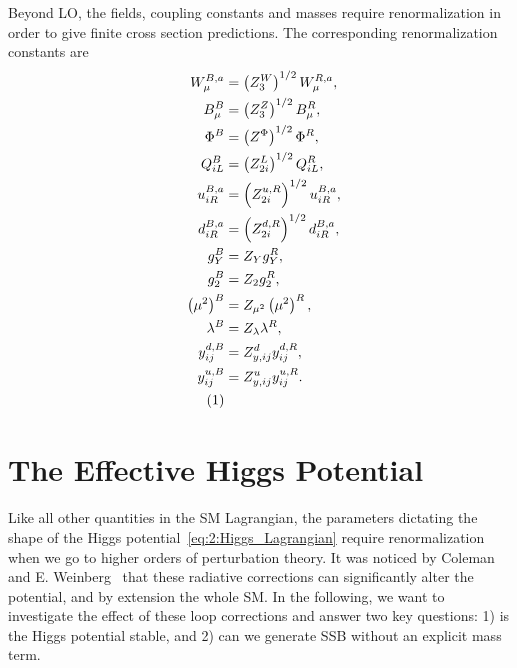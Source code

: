 Beyond \acs{LO}, the fields, coupling constants and masses require renormalization in order to give finite cross section predictions. The corresponding renormalization constants are
\begin{align*}
  W_\mu^{B,a} &= \left(Z_3^W \right)^{1/2} W_\mu^{R,a}, \\
  B_\mu^{B} &= \left(Z_3^Z \right)^{1/2} B_\mu^{R}, \\
  \Phi^{B} &= \left(Z^\Phi \right)^{1/2} \Phi^{R}, \\
  Q_{iL}^{B} &= \left(Z_{2i}^L \right)^{1/2} Q_{iL}^{R}, \\
  u_{iR}^{B,a} &= \left(Z_{2i}^{u,R} \right)^{1/2} u_{iR}^{B,a}, \\
  d_{iR}^{B,a} &= \left(Z_{2i}^{d,R} \right)^{1/2} d_{iR}^{B,a}, \\
  g_Y^B &= Z_Y g_Y^R ,\\
  g_2^B &= Z_2 g_2^R ,\\
  \left(\mu^2 \right)^B &= Z_{\mu^2} \left( \mu^2 \right)^R, \\
  \lambda^B &= Z_\lambda \lambda^R ,\\
  y_{ij}^{d,B} &= Z_{y,ij}^{d} y_{ij}^{d,R}, \\
  y_{ij}^{u,B} &= Z_{y,ij}^{u} y_{ij}^{u,R}. \\
  \refstepcounter{equation}
  \tag{\theequation} \label{eq:2:renormalization}
\end{align*}

\chapter{The Effective Higgs Potential} \label{sec:2:effective_higgs_potential}
Like all other quantities in the \acs{SM} Lagrangian, the parameters dictating the shape of the Higgs potential~\eqref{eq:2:Higgs_Lagrangian} require renormalization when we go to higher orders of perturbation theory. It was noticed by Coleman and E. Weinberg~\cite{Coleman:1973jx} that these radiative corrections can significantly alter the potential, and by extension the whole \acs{SM}. In the following, we want to investigate the effect of these loop corrections and answer two key questions: 1) is the Higgs potential stable, and 2) can we generate \acs{SSB} without an explicit mass term.

